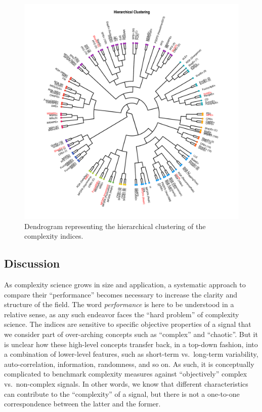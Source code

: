 \documentclass[
  man]{apa6}
\begin{document}
\begin{figure}
\centering
\includegraphics{manuscript_files/figure-latex/clustering-1.pdf}
\caption{\label{fig:clustering}Dendrogram representing the hierarchical clustering of the complexity indices.}
\end{figure}

\hypertarget{discussion}{%
\subsection{Discussion}\label{discussion}}

As complexity science grows in size and application, a systematic approach to compare their ``performance'' becomes necessary to increase the clarity and structure of the field. The word \emph{performance} is here to be understood in a relative sense, as any such endeavor faces the ``hard problem'' of complexity science. The indices are sensitive to specific objective properties of a signal that we consider part of over-arching concepts such as ``complex'' and ``chaotic''. But it is unclear how these high-level concepts transfer back, in a top-down fashion, into a combination of lower-level features, such as short-term vs.~long-term variability, auto-correlation, information, randomness, and so on. As such, it is conceptually complicated to benchmark complexity measures against ``objectively'' complex vs.~non-complex signals. In other words, we know that different characteristics can contribute to the ``complexity'' of a signal, but there is not a one-to-one correspondence between the latter and the former.
\end{document}

